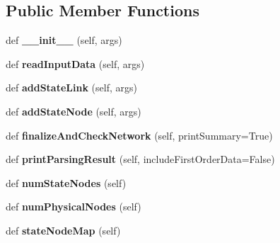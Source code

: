 \subsection*{Public Member Functions}
\begin{DoxyCompactItemize}
\item 
\mbox{\label{classinfomap_1_1MemNetwork_a34b6d98224541d7556462a5fb20fed2e}} 
def {\bfseries \+\_\+\+\_\+init\+\_\+\+\_\+} (self, args)
\item 
\mbox{\label{classinfomap_1_1MemNetwork_a8dd1f635a2491efbfd6c0186996bce16}} 
def {\bfseries read\+Input\+Data} (self, args)
\item 
\mbox{\label{classinfomap_1_1MemNetwork_a23744fbf5f8ba91c0cc0882e6b5a0ba2}} 
def {\bfseries add\+State\+Link} (self, args)
\item 
\mbox{\label{classinfomap_1_1MemNetwork_a2d3d1abcb83e711541cdf2a1c8d3ba4c}} 
def {\bfseries add\+State\+Node} (self, args)
\item 
\mbox{\label{classinfomap_1_1MemNetwork_a5e93b430eaeb5093e10125387b67439a}} 
def {\bfseries finalize\+And\+Check\+Network} (self, print\+Summary=True)
\item 
\mbox{\label{classinfomap_1_1MemNetwork_a7b350841cba9ae06684585b3183d8db7}} 
def {\bfseries print\+Parsing\+Result} (self, include\+First\+Order\+Data=False)
\item 
\mbox{\label{classinfomap_1_1MemNetwork_a97cf501c06543a3d86d41c657967bd61}} 
def {\bfseries num\+State\+Nodes} (self)
\item 
\mbox{\label{classinfomap_1_1MemNetwork_a2420e9ee73ad7f51f32775bfed2f3235}} 
def {\bfseries num\+Physical\+Nodes} (self)
\item 
\mbox{\label{classinfomap_1_1MemNetwork_a2716366e318e5ffb50fc76edb58dc1be}} 
def {\bfseries state\+Node\+Map} (self)
\item 
\mbox{\label{classinfomap_1_1MemNetwork_a2470b64f817b7e6f39f8f1ac6ebf11e7}} 

\end{DoxyCompactItemize}
